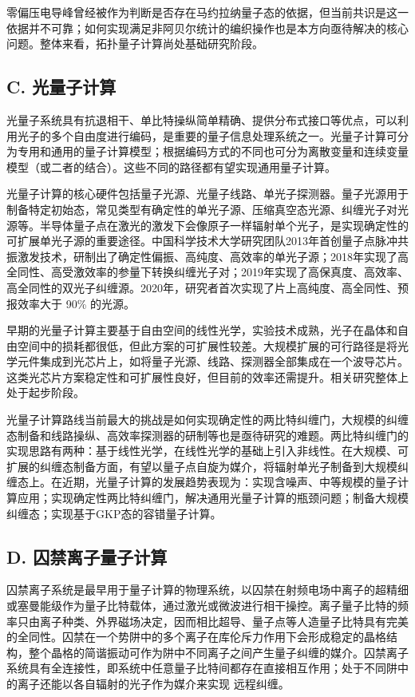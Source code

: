 \documentclass[aps,prl,twocolumn,groupedaddress]{revtex4-2}
\begin{document}
零偏压电导峰曾经被作为判断是否存在马约拉纳量子态的依据，但当前共识是这一依据并不可靠；如何实现满足非阿贝尔统计的编织操作也是本方向亟待解决的核心问题。整体来看，拓扑量子计算尚处基础研究阶段。

\subsection{C. 光量子计算}

光量子系统具有抗退相干、单比特操纵简单精确、提供分布式接口等优点，可以利用光子的多个自由度进行编码，是重要的量子信息处理系统之一。光量子计算可分为专用和通用的量子计算模型；根据编码方式的不同也可分为离散变量和连续变量模型（或二者的结合）。这些不同的路径都有望实现通用量子计算。

光量子计算的核心硬件包括量子光源、光量子线路、单光子探测器。量子光源用于制备特定初始态，常见类型有确定性的单光子源、压缩真空态光源、纠缠光子对光源等。半导体量子点在激光的激发下会像原子一样辐射单个光子，是实现确定性的可扩展单光子源的重要途径。中国科学技术大学研究团队2013年首创量子点脉冲共振激发技术，研制出了确定性偏振、高纯度、高效率的单光子源；2018年实现了高全同性、高受激效率的参量下转换纠缠光子对；2019年实现了高保真度、高效率、高全同性的双光子纠缠源。2020年，研究者首次实现了片上高纯度、高全同性、预报效率大于 90\% 的光源。

早期的光量子计算主要基于自由空间的线性光学，实验技术成熟，光子在晶体和自由空间中的损耗都很低，但此方案的可扩展性较差。大规模扩展的可行路径是将光学元件集成到光芯片上，如将量子光源、线路、探测器全部集成在一个波导芯片。这类光芯片方案稳定性和可扩展性良好，但目前的效率还需提升。相关研究整体上处于起步阶段。

光量子计算路线当前最大的挑战是如何实现确定性的两比特纠缠门，大规模的纠缠态制备和线路操纵、高效率探测器的研制等也是亟待研究的难题。两比特纠缠门的实现思路有两种：基于线性光学，在线性光学的基础上引入非线性。在大规模、可扩展的纠缠态制备方面，有望以量子点自旋为媒介，将辐射单光子制备到大规模纠缠态上。在近期，光量子计算的发展趋势表现为：实现含噪声、中等规模的量子计算应用；实现确定性两比特纠缠门，解决通用光量子计算的瓶颈问题；制备大规模纠缠态；实现基于GKP态的容错量子计算。

\subsection{D. 囚禁离子量子计算}

囚禁离子系统是最早用于量子计算的物理系统，以囚禁在射频电场中离子的超精细或塞曼能级作为量子比特载体，通过激光或微波进行相干操控。离子量子比特的频率只由离子种类、外界磁场决定，因而相比超导、量子点等人造量子比特具有完美的全同性。囚禁在一个势阱中的多个离子在库伦斥力作用下会形成稳定的晶格结构，整个晶格的简谐振动可作为阱中不同离子之间产生量子纠缠的媒介。囚禁离子系统具有全连接性，即系统中任意量子比特间都存在直接相互作用；处于不同阱中的离子还能以各自辐射的光子作为媒介来实现
远程纠缠。
\end{document}
